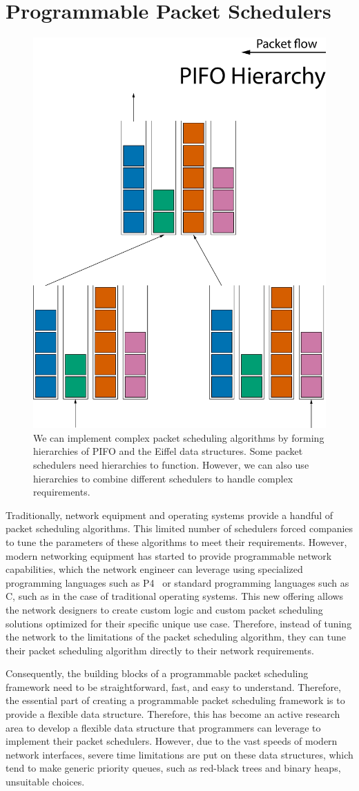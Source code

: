 \documentclass[sigconf, nonacm]{acmart}
\begin{document}
\section{Programmable Packet Schedulers}

\begin{figure}
  \includegraphics[width=0.5\linewidth]{pifo-hierarchy.pdf}
  \caption{We can implement complex packet scheduling algorithms by forming hierarchies of PIFO and the Eiffel data structures. Some packet schedulers need hierarchies to function. However, we can also use hierarchies to combine different schedulers to handle complex requirements.}
  \label{fig:pifo_hierarchy}
\end{figure}

Traditionally, network equipment and operating systems provide a handful of packet scheduling algorithms. This limited number of schedulers forced companies to tune the parameters of these algorithms to meet their requirements. However, modern networking equipment has started to provide programmable network capabilities, which the network engineer can leverage using specialized programming languages such as P4~\cite{p4} or standard programming languages such as C, such as in the case of traditional operating systems. This new offering allows the network designers to create custom logic and custom packet scheduling solutions optimized for their specific unique use case. Therefore, instead of tuning the network to the limitations of the packet scheduling algorithm, they can tune their packet scheduling algorithm directly to their network requirements.

Consequently, the building blocks of a programmable packet scheduling framework need to be straightforward, fast, and easy to understand. Therefore, the essential part of creating a programmable packet scheduling framework is to provide a flexible data structure. Therefore, this has become an active research area to develop a flexible data structure that programmers can leverage to implement their packet schedulers. However, due to the vast speeds of modern network interfaces, severe time limitations are put on these data structures, which tend to make generic priority queues, such as red-black trees and binary heaps, unsuitable choices.
\end{document}
